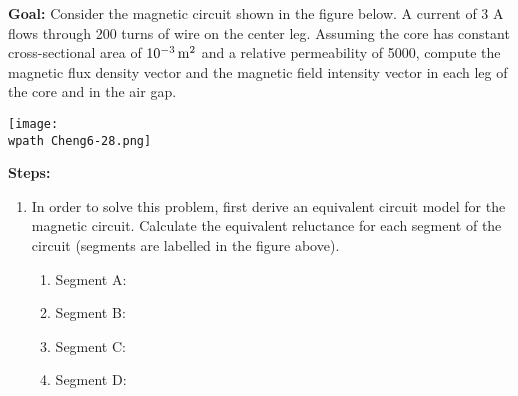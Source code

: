 \documentclass[../../header.tex]{subfiles}
\begin{document}
\textbf{Goal:} Consider the magnetic circuit shown in the figure below. A current of 3 A flows through 200 turns of wire on the center leg. Assuming the core has constant cross-sectional area of $10^{-3}\,\text{m}^2$ and a relative permeability of 5000, compute the magnetic flux density vector and the magnetic field intensity vector in each leg of the core and in the air gap.
\begin{center}
\texttt{[image: \\wpath Cheng6-28.png]}
\end{center}
\textbf{Steps:} 
\begin{enumerate}
\item In order to solve this problem, first derive an equivalent circuit model for the magnetic circuit. Calculate the equivalent reluctance for each segment of the circuit (segments are labelled in the figure above).
\begin{enumerate}
\item Segment A: \\

\item Segment B: \\

\item Segment C: \\

\item Segment D: \\


\end{enumerate}
\end{enumerate}
\end{document}
